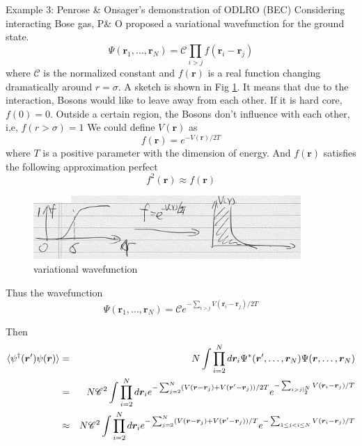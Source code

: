 Example 3: Penrose \& Onsager's demonstration of ODLRO (BEC)
Considering interacting Bose gas, P\& O proposed a variational wavefunction for the ground state.
\begin{equation}
\Psi(\bm r_1,\ldots,\bm r_N) =\mathscr C \prod_{i>j} f(\bm r_i-\bm r_j)
\end{equation}
where $\mathscr C$ is the normalized constant and $f(\bm r)$ is a real function changing dramatically around $r = \sigma$. A sketch is shown in Fig \ref{fig:1-6}.
It means that due to the interaction, Bosons would like to leave away from each other. If it is hard core, $f(0) = 0$. Outside a certain region, the Bosons don't influence with each other, i,e, $f(r>\sigma) = 1$
We could define $V(\bm r)$ as 
\begin{equation}
f(\bm r) = e^{-V(\bm r)/2 T}
\end{equation}
where $T$ is a positive parameter with the dimension of energy. 
And $f(\bm r)$ satisfies the following approximation perfect
\begin{equation}
f^2(\bm r) \approx f(\bm r)
\end{equation}



\begin{figure}[htbp]
\centering
\includegraphics[width=4in]{image/1-6-var_func.pdf} 
\caption{variational wavefunction}
\label{fig:1-6}
\end{figure}

Thus the wavefunction
\begin{equation}
\Psi(\bm r_1,\ldots,\bm r_N) =\mathscr C e^{-\sum_{i>j}V(\bm r_i-\bm r_j)/2T}
\end{equation}

Then 
\begin{eqnarray}
\braket{\psi^\dag(\bm r')\psi(\bm r)} &=& N \int \prod_{i=2}^N d\bm r_i \Psi^*(\bm r',\ldots,\bm r_N)\Psi(\bm r,\ldots,\bm r_N)\notag\\
&=& N \mathscr C^2\int \prod_{i=2}^N d\bm r_i e^{-\sum_{j=2}^N (V(\bm r-\bm r_j)+V(\bm r'-\bm r_j))/2T} e^{-\sum_{i>j|_2^N} V(\bm r_i-\bm r_j)/T}\notag\\
&\approx& N \mathscr C^2\int \prod_{i=2}^N d\bm r_i e^{-\sum_{j=2}^N (V(\bm r-\bm r_j)+V(\bm r'-\bm r_j))/T} e^{-\sum_{1\leq j<i\leq N} V(\bm r_i-\bm r_j)/T}\notag\\
\end{eqnarray}

